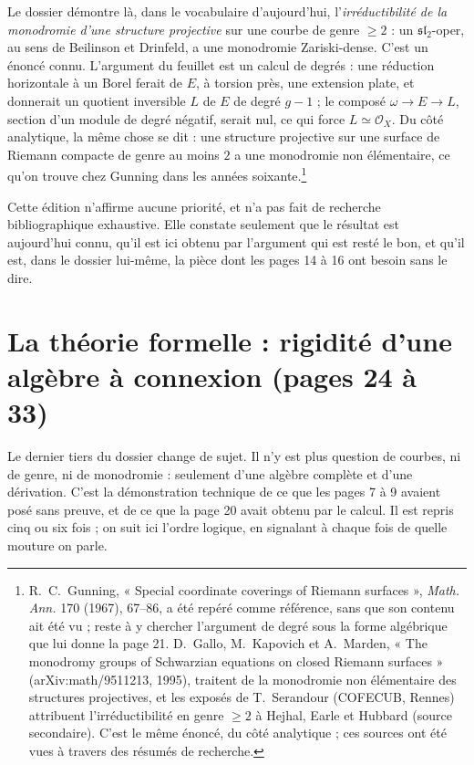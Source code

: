 \documentclass[11pt,a4paper]{article}
\begin{document}
Le dossier démontre là,
dans le vocabulaire d'aujourd'hui, l'\emph{irréductibilité de la
monodromie d'une structure projective} sur une courbe de genre $\geqslant 2$ :
un $\mathfrak{sl}_2$-oper, au sens de Beilinson et Drinfeld, a une monodromie
Zariski-dense. C'est un énoncé connu. L'argument du feuillet est un calcul de
degrés : une réduction horizontale à un Borel ferait de $E$, à torsion près,
une extension plate, et donnerait un quotient inversible $L$ de $E$ de degré
$g-1$ ; le composé $\omega \to E \to L$, section d'un module de degré
négatif, serait nul, ce qui force $L \simeq \mathcal{O}_X$. Du côté analytique, la même chose se dit :
une structure projective sur une surface de Riemann compacte de genre au moins
$2$ a une monodromie non élémentaire, ce qu'on trouve chez Gunning dans les
années soixante.\footnote{R.~C.~Gunning, « Special coordinate coverings of Riemann
surfaces », \emph{Math. Ann.} 170 (1967), 67--86, a été repéré comme référence,
sans que son contenu ait été vu ; reste à y chercher l'argument de degré sous la
forme algébrique que lui donne la page 21. D.~Gallo, M.~Kapovich et A.~Marden,
« The monodromy groups of Schwarzian equations on closed Riemann surfaces »
(arXiv:math/9511213, 1995), traitent de la monodromie non élémentaire des
structures projectives, et les exposés de T.~Serandour (COFECUB, Rennes)
attribuent l'irréductibilité en genre $\geqslant 2$ à Hejhal, Earle et Hubbard
(source secondaire). C'est le même énoncé, du côté analytique ; ces sources
ont été vues à travers des résumés de recherche.}

Cette édition n'affirme aucune priorité, et n'a pas fait de recherche
bibliographique exhaustive. Elle constate seulement que le résultat est
aujourd'hui connu, qu'il est ici obtenu par l'argument qui est resté le bon,
et qu'il est, dans le dossier lui-même, la pièce dont les pages 14 à 16 ont
besoin sans le dire.

\section*{La théorie formelle : rigidité d'une algèbre à connexion (pages 24 à 33)}

Le dernier tiers du dossier change de sujet. Il n'y est plus question de
courbes, ni de genre, ni de monodromie : seulement d'une algèbre complète et
d'une dérivation. C'est la démonstration technique de ce que les pages 7 à 9
avaient posé sans preuve, et de ce que la page 20 avait obtenu par le calcul.
Il est repris cinq ou six fois ; on suit ici l'ordre logique, en signalant à
chaque fois de quelle mouture on parle.
\end{document}
